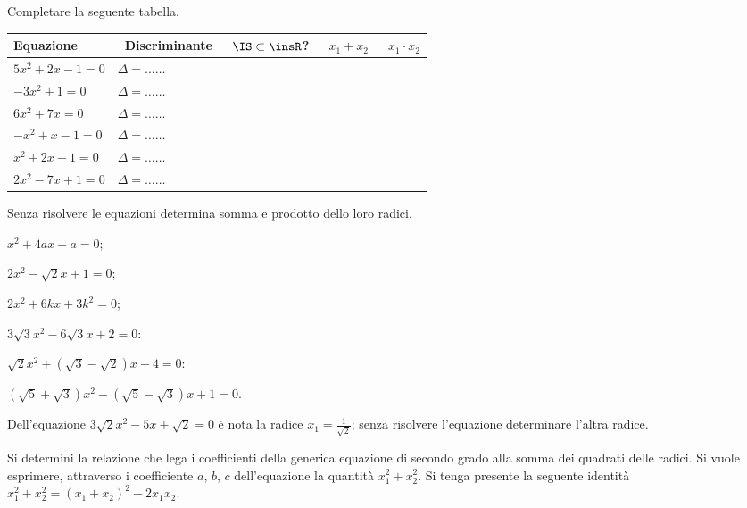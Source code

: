\begin{esercizio}
 \label{ese:3.67}
Completare la seguente tabella.

 \begin{tabular*}{.9\textwidth}{@{\extracolsep{\fill}}*{5}{l}}
 \toprule
 Equazione &~Discriminante&~$\IS\subset\insR$? &~$x_1 + x_2$ &~$x_1 \cdot x_2$\\
\midrule
 $5 x^{2} + 2 x-1 = 0$& $\Delta=\ldots \ldots$ & &	&\\
 $- 3 x^{2} + 1 = 0$&$\Delta=\ldots \ldots$ & &	&\\
 $6 x^{2} + 7 x = 0$&$\Delta=\ldots \ldots$ & &	&\\
 $- x^{2} + x-1 = 0$&$\Delta=\ldots \ldots$ & &	&\\
 $x^{2} + 2 x + 1 = 0$&$\Delta=\ldots \ldots$ & &	&\\
 $2 x^{2}-7 x + 1 = 0$&$\Delta=\ldots \ldots $ & &	&\\
\bottomrule
 \end{tabular*}

\end{esercizio}
\newpage
\begin{esercizio}
 \label{ese:3.68}
Senza risolvere le equazioni determina somma e prodotto dello loro radici.
\begin{multicols}{2}
\begin{enumeratea}
\item $x^{2} + 4ax + a = 0$;
\item $2x^{2}-\sqrt{2} x + 1 = 0$;
\item $2x^{2} + 6kx + 3k^{2} = 0$;
\item $3 \sqrt{3} x^{2}-6 \sqrt{3} x + 2 = 0$:
\item $\sqrt{2} x^{2} + (\sqrt{3}-\sqrt{2}) x + 4 = 0$:
\item $(\sqrt{5} + \sqrt{3}) x^{2}-(\sqrt{5}-\sqrt{3}) x + 1= 0$.
\end{enumeratea}
\end{multicols}
\end{esercizio}

\begin{esercizio}
 \label{ese:3.69}
Dell’equazione $3 \sqrt{2} x^{2}-5 x + \sqrt{2} = 0$ è nota la radice $x_{1} = \frac{1}{\sqrt{2}}$; senza risolvere l’equazione determinare l'altra radice.
\end{esercizio}

\begin{esercizio}
 \label{ese:3.70}
Si determini la relazione che lega i coefficienti della generica equazione di secondo grado alla somma dei quadrati delle radici. Si vuole esprimere,
attraverso i coefficiente $a$, $b$, $c$ dell’equazione la quantità $x_{1}^{2} + x_{2}^{2}$. Si tenga presente la seguente identità $x_{1}^{2} + x_{2}^{2} = (x_{1} + x_{2} )^{2}-2 x_{1} x_{2}$.
\end{esercizio}

